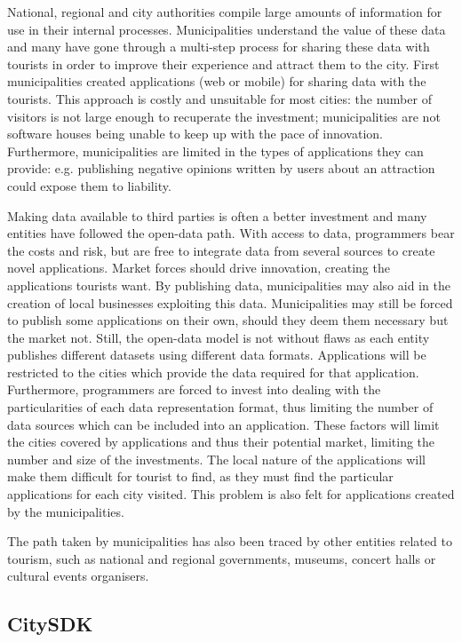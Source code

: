 \documentclass[times]{ettauth}
\begin{document}
National, regional and city authorities compile large amounts of information for use in their internal processes.
Municipalities understand the value of these data and many have gone through a multi-step process for sharing these data with tourists in order to improve their experience and attract them to the city.
First municipalities created applications (web or mobile) for sharing data with the tourists.
This approach is costly and unsuitable for most cities: the number of visitors is not large enough to recuperate the investment; municipalities are not software houses being unable to keep up with the pace of innovation. 
Furthermore, municipalities are limited in the types of applications they can provide: e.g. publishing negative opinions written by users about an attraction could expose them to liability.

Making data available to third parties is often a better investment and many entities have followed the open-data path.
With access to data, programmers bear the costs and risk, but are free to integrate data from several sources to create novel applications.
Market forces should drive innovation, creating the applications tourists want.
By publishing data, municipalities may also aid in the creation of local businesses exploiting this data.
Municipalities may still be forced to publish some applications on their own, should they deem them necessary but the market not. 
Still, the open-data model is not without flaws as each entity publishes different datasets using different data formats.
Applications will be restricted to the cities which provide the data required for that application.
Furthermore, programmers are forced to invest into dealing with the particularities of each data representation format, thus limiting the number of data sources which can be included into an application.
These factors will limit the cities covered by applications and thus their potential market, limiting the number and size of the investments.
The local nature of the applications will make them difficult for tourist to find, as they must find the particular applications for each city visited.
This problem is also felt for applications created by the municipalities.

The path taken by municipalities has also been traced by other entities related to tourism, such as national and regional governments, museums, concert halls or cultural events organisers.

\subsection{CitySDK}
\label{s:citysdk}
\end{document}
